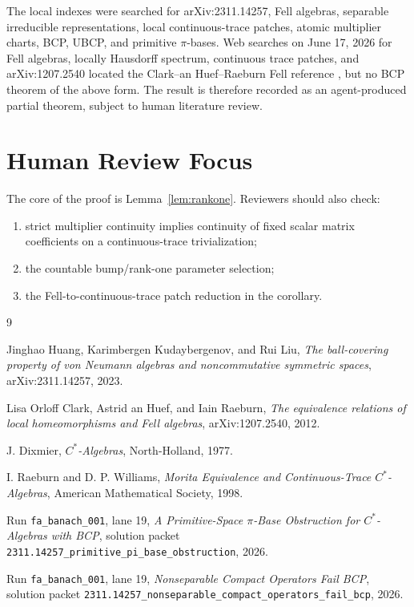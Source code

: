 \documentclass[11pt]{article}
\begin{document}
The local indexes were searched for arXiv:2311.14257, Fell algebras,
separable irreducible representations, local continuous-trace patches, atomic
multiplier charts, BCP, UBCP, and primitive \(\pi\)-bases.  Web searches on
June 17, 2026 for Fell algebras, locally Hausdorff spectrum, continuous trace
patches, and arXiv:1207.2540 located the Clark--an Huef--Raeburn Fell
reference \cite{CHR}, but no BCP theorem of the above form.  The result is
therefore recorded as an agent-produced partial theorem, subject to human
literature review.

\section*{Human Review Focus}

The core of the proof is Lemma~\ref{lem:rankone}.  Reviewers should also
check:
\begin{enumerate}
    \item strict multiplier continuity implies continuity of fixed scalar
          matrix coefficients on a continuous-trace trivialization;
    \item the countable bump/rank-one parameter selection;
    \item the Fell-to-continuous-trace patch reduction in the corollary.
\end{enumerate}

\begin{thebibliography}{9}

Jinghao Huang, Karimbergen Kudaybergenov, and Rui Liu,
\emph{The ball-covering property of von Neumann algebras and noncommutative
symmetric spaces},
arXiv:2311.14257, 2023.

Lisa Orloff Clark, Astrid an Huef, and Iain Raeburn,
\emph{The equivalence relations of local homeomorphisms and Fell algebras},
arXiv:1207.2540, 2012.

J. Dixmier,
\emph{\(C^*\)-Algebras},
North-Holland, 1977.

I. Raeburn and D. P. Williams,
\emph{Morita Equivalence and Continuous-Trace \(C^*\)-Algebras},
American Mathematical Society, 1998.

Run \texttt{fa\_banach\_001}, lane 19,
\emph{A Primitive-Space \(\pi\)-Base Obstruction for \(C^*\)-Algebras with
BCP},
solution packet
\texttt{2311.14257\_primitive\_pi\_base\_obstruction}, 2026.

Run \texttt{fa\_banach\_001}, lane 19,
\emph{Nonseparable Compact Operators Fail BCP},
solution packet
\texttt{2311.14257\_nonseparable\_compact\_operators\_fail\_bcp}, 2026.

\end{thebibliography}
\end{document}
